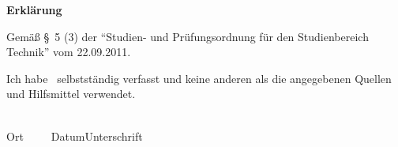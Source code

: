 
\newpage
\thispagestyle{empty}

\begin{center}
\Large\bfseries Erkl\"arung
\end{center}

\noindent
Gem\"a\ss{} \S~5 (3) der "`Studien- und Prüfungsordnung f\"ur den Studienbereich
Technik"' vom 22.09.2011.

\medskip
\noindent
Ich habe \WasErklaerung\ selbstst\"andig verfasst und
keine anderen als die angegebenen Quellen und Hilfsmittel verwendet.

\vspace{3cm}
\noindent
\underline{\hspace{4cm}}\hfill\underline{\hspace{6cm}}\\
Ort~~~~~Datum\hfill Unterschrift\hspace{3.7cm}
